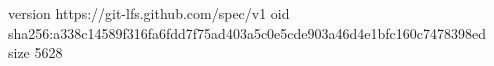 version https://git-lfs.github.com/spec/v1
oid sha256:a338c14589f316fa6fdd7f75ad403a5c0e5cde903a46d4e1bfc160c7478398ed
size 5628
